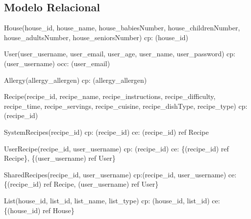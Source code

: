 \subsection{Modelo Relacional}
{\parindent 0pt
	\begin{description}
		\item House(house\_id, house\_name, house\_babiesNumber, house\_childrenNumber, house\_adultsNumber, house\_seniorsNumber) \newline
		\acrshort{cp}: (house\_id) 
		
		\item User(user\_username, user\_email, user\_age, user\_name, user\_password) \newline
		\acrshort{cp}: (user\_username)  \newline
		\acrshort{occ}: (user\_email)
		
		\item Allergy(allergy\_allergen) \newline
		\acrshort{cp}: (allergy\_allergen) 
		
		\item Recipe(recipe\_id, recipe\_name, recipe\_instructions, recipe\_difficulty, recipe\_time, recipe\_servings, recipe\_cuisine, recipe\_dishType, recipe\_type) \newline
		\acrshort{cp}: (recipe\_id) 
		
		\item SystemRecipes(recipe\_id) \newline
		\acrshort{cp}: (recipe\_id) \newline
		\acrshort{ce}: (recipe\_id) ref Recipe
		
		\item UserRecipe(recipe\_id, user\_username) \newline
		\acrshort{cp}: (recipe\_id) \newline
		\acrshort{ce}: \{(recipe\_id) ref Recipe\}, \{(user\_username) ref User\}
		
		\item SharedRecipes(recipe\_id, user\_username) \newline
		\acrshort{cp}:(recipe\_id, user\_username)
		\acrshort{ce}: \{(recipe\_id) ref Recipe, (user\_username) ref User\}
		
		\item List(house\_id, list\_id, list\_name, list\_type) \newline
		\acrshort{cp}: (house\_id, list\_id) \newline
		\acrshort{ce}: \{(house\_id) ref House\}
		

\end{description}}
